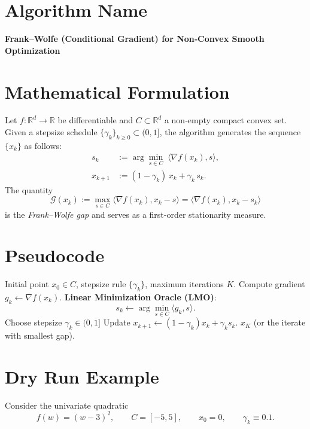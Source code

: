 \documentclass{article}
\newcommand{\grad}{\nabla}
\newcommand{\inner}[2]{\langle #1,#2\rangle}
\newcommand{\gap}{\mathcal{G}}
\begin{document}
\section*{Algorithm Name}
\textbf{Frank–Wolfe (Conditional Gradient) for Non‑Convex Smooth Optimization}
\section*{Mathematical Formulation}
Let $f:\mathbb{R}^{d}\rightarrow\mathbb{R}$ be differentiable and $C\subset\mathbb{R}^{d}$ a non‑empty compact convex set.  
Given a stepsize schedule $\{\gamma_k\}_{k\ge 0}\subset (0,1]$, the algorithm generates the sequence $\{x_k\}$ as follows:
\begin{align}
s_k &:= \arg\min_{s\in C}\;\inner{\grad f(x_k)}{s}, \tag{1}\\[4pt]
x_{k+1} &:= (1-\gamma_k)\,x_k + \gamma_k\, s_k . \tag{2}
\end{align}
The quantity
\[
\gap(x_k):=\max_{s\in C}\inner{\grad f(x_k)}{x_k-s}
      =\inner{\grad f(x_k)}{x_k-s_k}
\]
is the \emph{Frank–Wolfe gap} and serves as a first‑order stationarity measure.

\section*{Pseudocode}
\begin{algorithm}[H]
\caption{Frank–Wolfe for Non‑Convex Smooth Problems}
\begin{algorithmic}[1]
\REQUIRE Initial point $x_0\in C$, stepsize rule $\{\gamma_k\}$, maximum iterations $K$.
    \STATE Compute gradient $g_k \gets \grad f(x_k)$.
    \STATE \textbf{Linear Minimization Oracle (LMO)}:
    \[
        s_k \gets \arg\min_{s\in C}\inner{g_k}{s}.
    \]
    \STATE Choose stepsize $\gamma_k\in(0,1]$ 
    \STATE Update $x_{k+1}\gets (1-\gamma_k)x_k+\gamma_k s_k$.
\ENDFOR
\RETURN $x_K$ (or the iterate with smallest gap).
\end{algorithmic}
\end{algorithm}
\section*{Dry Run Example}
Consider the univariate quadratic 
\[
f(w)=(w-3)^2,\qquad C=[-5,5],\qquad x_0=0,\qquad \gamma_k\equiv 0.1 .
\]
\end{document}
